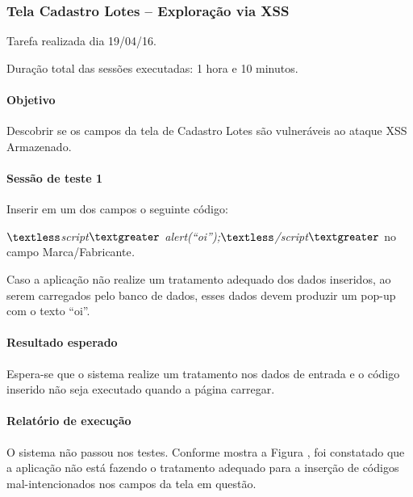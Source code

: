 \documentclass[
    12pt,               %
    openright,          %
    oneside,            %
    a4paper,            %
    section=TITLE,     %
    english,            %
    french,             %
    spanish,            %
    brazil              %
    ]{abntex2}
\begin{document}
\subsubsection*{Tela Cadastro Lotes -- Exploração via XSS}

Tarefa realizada dia 19/04/16.


Duração total das sessões executadas: 1 hora e 10 minutos.



\paragraph*{Objetivo}

Descobrir se os campos da tela de Cadastro Lotes são vulneráveis ao ataque XSS Armazenado.



\paragraph*{Sessão de teste 1}

Inserir em um dos campos o seguinte código:


\emph{$\textless$script$\textgreater$ alert(\textquotedblleft{}oi\textquotedblright{});$\textless$/script$\textgreater$ }no campo Marca/Fabricante\emph{.}


Caso a aplicação não realize um tratamento adequado dos dados inseridos, ao serem carregados pelo banco de dados, esses dados devem produzir um pop-up com o texto \textquotedblleft{}oi\textquotedblright{}.



\paragraph*{Resultado esperado}

Espera-se que o sistema realize um tratamento nos dados de entrada e o código inserido não seja executado quando a página carregar.



\paragraph*{Relatório de execução}

O sistema não passou nos testes. Conforme mostra a Figura , foi constatado que a aplicação não está fazendo o tratamento adequado para a inserção de códigos mal-intencionados nos campos da tela em questão.
\end{document}
